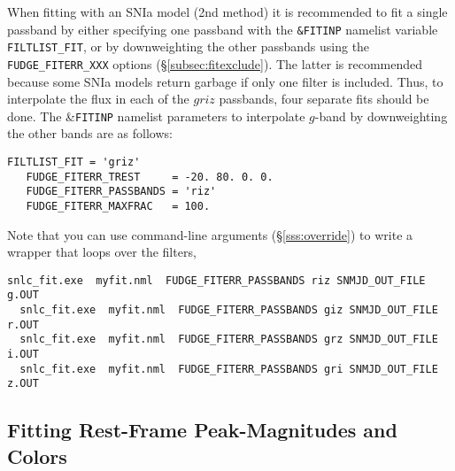 \documentclass[12pt]{article}
\begin{document}
\bigskip
When fitting with an SNIa model (2nd method) it is recommended 
to fit a single passband by either specifying one passband with 
the {\tt \&FITINP} namelist variable {\tt FILTLIST\_FIT}, 
or by downweighting the other passbands using the 
{\tt FUDGE\_FITERR\_XXX} options (\S\ref{subsec:fitexclude}). 
The latter is recommended because some SNIa models return
garbage if only one filter is included.
Thus, to interpolate the flux in each of the $griz$ passbands, 
four separate fits should be done. The \&{\tt FITINP} namelist 
parameters to interpolate $g$-band by downweighting the other
bands are as follows:
%
\begin{Verbatim}[frame=single]
   FILTLIST_FIT = 'griz'
   FUDGE_FITERR_TREST     = -20. 80. 0. 0.
   FUDGE_FITERR_PASSBANDS = 'riz'
   FUDGE_FITERR_MAXFRAC   = 100.
\end{Verbatim}
%
Note that you can use command-line arguments (\S\ref{sss:override})
to write a wrapper that loops over the filters,
%
\begin{Verbatim}[frame=single]
  snlc_fit.exe  myfit.nml  FUDGE_FITERR_PASSBANDS riz SNMJD_OUT_FILE  g.OUT
  snlc_fit.exe  myfit.nml  FUDGE_FITERR_PASSBANDS giz SNMJD_OUT_FILE  r.OUT
  snlc_fit.exe  myfit.nml  FUDGE_FITERR_PASSBANDS grz SNMJD_OUT_FILE  i.OUT
  snlc_fit.exe  myfit.nml  FUDGE_FITERR_PASSBANDS gri SNMJD_OUT_FILE  z.OUT
\end{Verbatim}



   \subsection{Fitting Rest-Frame Peak-Magnitudes and Colors}
   \label{subsec:FitRestMag}

\newcommand{\Mstar}{M^{\star}}
\end{document}

